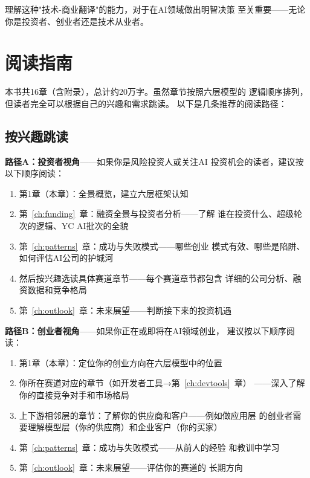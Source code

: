 理解这种"技术-商业翻译"的能力，对于在AI领域做出明智决策
至关重要——无论你是投资者、创业者还是技术从业者。


\section{阅读指南}
\label{sec:overview-reading-guide}

本书共16章（含附录），总计约20万字。虽然章节按照六层模型的
逻辑顺序排列，但读者完全可以根据自己的兴趣和需求跳读。
以下是几条推荐的阅读路径：

\subsection{按兴趣跳读}

\textbf{路径A：投资者视角}——如果你是风险投资人或关注AI
投资机会的读者，建议按以下顺序阅读：
\begin{enumerate}
  \item 第1章（本章）：全景概览，建立六层框架认知
  \item 第~\ref{ch:funding}~章：融资全景与投资者分析——了解
    谁在投资什么、超级轮次的逻辑、YC AI批次的全貌
  \item 第~\ref{ch:patterns}~章：成功与失败模式——哪些创业
    模式有效、哪些是陷阱、如何评估AI公司的护城河
  \item 然后按兴趣选读具体赛道章节——每个赛道章节都包含
    详细的公司分析、融资数据和竞争格局
  \item 第~\ref{ch:outlook}~章：未来展望——判断接下来的投资机遇
\end{enumerate}

\textbf{路径B：创业者视角}——如果你正在或即将在AI领域创业，
建议按以下顺序阅读：
\begin{enumerate}
  \item 第1章（本章）：定位你的创业方向在六层模型中的位置
  \item 你所在赛道对应的章节（如开发者工具→第~\ref{ch:devtools}~章）
    ——深入了解你的直接竞争对手和市场格局
  \item 上下游相邻层的章节：了解你的供应商和客户——例如做应用层
    的创业者需要理解模型层（你的供应商）和企业客户（你的买家）
  \item 第~\ref{ch:patterns}~章：成功与失败模式——从前人的经验
    和教训中学习
  \item 第~\ref{ch:outlook}~章：未来展望——评估你的赛道的
    长期方向
\end{enumerate}

